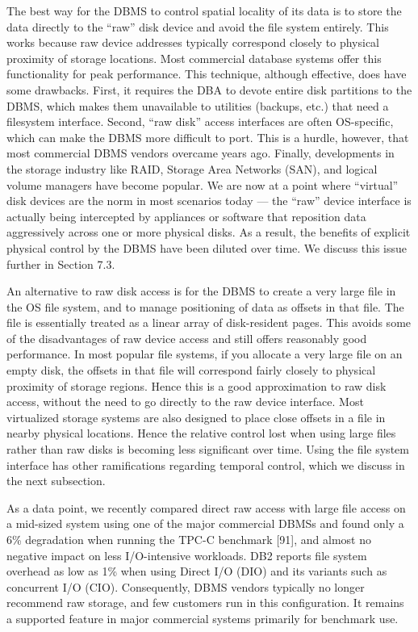 \documentclass[a4paper,11pt,twoside,openright]{book}
\begin{document}
The best way for the DBMS to control spatial locality of its data is to
store the data directly to the ``raw'' disk device and avoid the file
system entirely. This works because raw device addresses typically
correspond closely to physical proximity of storage locations. Most
commercial database systems offer this functionality for peak
performance. This technique, although effective, does have some
drawbacks. First, it requires the DBA to devote entire disk partitions
to the DBMS, which makes them unavailable to utilities (backups, etc.)
that need a filesystem interface. Second, ``raw disk'' access interfaces
are often OS-specific, which can make the DBMS more difficult to port.
This is a hurdle, however, that most commercial DBMS vendors overcame
years ago. Finally, developments in the storage industry like RAID,
Storage Area Networks (SAN), and logical volume managers have become
popular. We are now at a point where ``virtual'' disk devices are the
norm in most scenarios today --- the ``raw'' device interface is
actually being intercepted by appliances or software that reposition
data aggressively across one or more physical disks. As a result, the
benefits of explicit physical control by the DBMS have been diluted over
time. We discuss this issue further in Section 7.3.

An alternative to raw disk access is for the DBMS to create a very large
file in the OS file system, and to manage positioning of data as offsets
in that file. The file is essentially treated as a linear array of
disk-resident pages. This avoids some of the disadvantages of raw device
access and still offers reasonably good performance. In most popular
file systems, if you allocate a very large file on an empty disk, the
offsets in that file will correspond fairly closely to physical
proximity of storage regions. Hence this is a good approximation to raw
disk access, without the need to go directly to the raw device
interface. Most virtualized storage systems are also designed to place
close offsets in a file in nearby physical locations. Hence the relative
control lost when using large files rather than raw disks is becoming
less significant over time. Using the file system interface has other
ramifications regarding temporal control, which we discuss in the next
subsection.

As a data point, we recently compared direct raw access with large file
access on a mid-sized system using one of the major commercial DBMSs and
found only a 6\% degradation when running the TPC-C benchmark {[}91{]},
and almost no negative impact on less I/O-intensive workloads. DB2
reports file system overhead as low as 1\% when using Direct I/O (DIO)
and its variants such as concurrent I/O (CIO). Consequently, DBMS
vendors typically no longer recommend raw storage, and few customers run
in this configuration. It remains a supported feature in major
commercial systems primarily for benchmark use.
\end{document}
